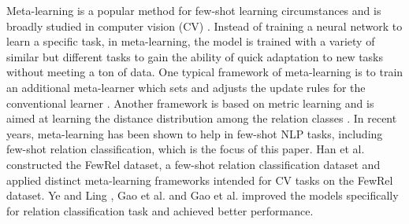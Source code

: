 Meta-learning is a popular method for few-shot learning circumstances and is broadly studied in computer vision (CV) \cite{LakeHuman,Santoro2016,proto}.
Instead of training a neural network to learn a specific task, in meta-learning, the model is trained with a variety of similar but different tasks to gain the ability of quick adaptation to new tasks without meeting a ton of data.
One typical framework of meta-learning is to train an additional meta-learner %
which sets and adjusts the update rules for the conventional learner \cite{Andry2016,Finn2017,HN}. Another framework is based on metric learning and is aimed at
learning the distance distribution among the relation classes \cite{Koch2015,Vinyals2016,proto}.
In recent years, meta-learning has been shown to help in few-shot NLP tasks,
including few-shot relation classification, which is the focus of this paper.
Han et al.  constructed the FewRel dataset, a few-shot relation classification dataset and applied distinct meta-learning frameworks intended for CV tasks on the FewRel dataset. Ye and Ling , Gao et al.  and Gao et al.  improved the models specifically for relation classification task
and achieved better performance.


